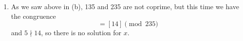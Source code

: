 \documentclass[12pt]{article}
\numberwithin{equation}{section}
\numberwithin{figure}{section}
\begin{document}
\begin{enumerate}
\begin{enumerate}
            \item As we saw above in (b), 135 and 235 are not coprime, but this time we have the 
            congruence 
            \begin{equation*}
                [135][x]=[14] \pmod{235}
            \end{equation*}
            and $5\nmid14$, so there is no solution for $x$.
        \end{enumerate}
    \end{enumerate}
\end{document}
